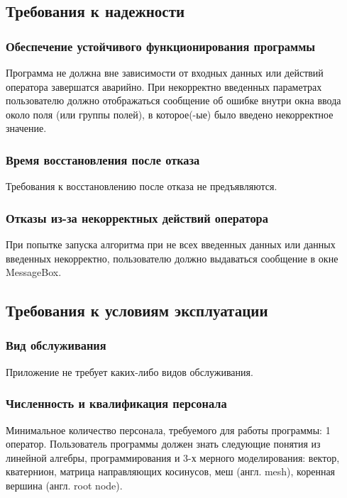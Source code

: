 \subsection{Требования к надежности}
\subsubsection{Обеспечение устойчивого функционирования программы}
Программа не должна вне зависимости от входных данных или действий оператора завершатся аварийно. При некорректно введенных параметрах пользователю должно отображаться сообщение об ошибке внутри окна ввода около поля (или группы полей), в которое(-ые) было введено некорректное значение.
\subsubsection{Время восстановления после отказа}
Требования к восстановлению после отказа не предъявляются.
\subsubsection{Отказы из-за некорректных действий оператора}
При попытке запуска алгоритма при не всех введенных данных или данных введенных некорректно, пользователю должно выдаваться сообщение в окне MessageBox.


\subsection{Требования к условиям эксплуатации}
\subsubsection{Вид обслуживания}
Приложение не требует каких-либо видов обслуживания.
\subsubsection{Численность и квалификация персонала}
Минимальное количество персонала, требуемого для работы программы: 1 оператор. Пользователь программы должен знать следующие понятия из линейной алгебры, программирования и 3-х мерного моделирования: вектор, кватернион, матрица направляющих косинусов, меш (англ. mesh), коренная вершина (англ. root node).



